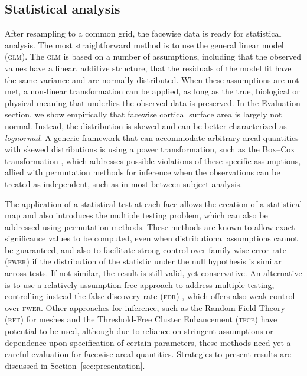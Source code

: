 \subsection{Statistical analysis}

After resampling to a common grid, the facewise data is ready for statistical analysis. The most straightforward method is to use the general linear model (\textsc{glm}). The \textsc{glm} is based on a number of assumptions, including that the observed values have a linear, additive structure, that the residuals of the model fit have the same variance and are normally distributed. When these assumptions are not met, a non-linear transformation can be applied, as long as the true, biological or physical meaning that underlies the observed data is preserved. In the Evaluation section, we show empirically that facewise cortical surface area is largely not normal. Instead, the distribution is skewed and can be better characterized as \emph{lognormal}. A generic framework that can accommodate arbitrary areal quantities with skewed distributions is using a power transformation, such as the Box--Cox transformation \citep{Box1964}, which addresses possible violations of these specific assumptions, allied with permutation methods for inference \citep{Holmes1996, Nichols2003} when the observations can be treated as independent, such as in most between-subject analysis.

The application of a statistical test at each face allows the creation of a statistical map and also introduces the multiple testing problem, which can also be addressed using permutation methods. These methods are known to allow exact significance values to be computed, even when distributional assumptions cannot be guaranteed, and also to facilitate strong control over family-wise error rate (\textsc{fwer}) if the distribution of the statistic under the null hypothesis is similar across tests. If not similar, the result is still valid, yet conservative. An alternative is to use a relatively assumption-free approach to address multiple testing, controlling instead the false discovery rate (\textsc{fdr}) \citep{Benjamini1995, Genovese2002}, which offers also weak control over \textsc{fwer}. Other approaches for inference, such as the Random Field Theory (\textsc{rft}) for meshes \citep{Worsley1999, Hagler2006} and the Threshold-Free Cluster Enhancement (\textsc{tfce}) \citep{Smith2009} have potential to be used, although due to reliance on stringent assumptions or dependence upon specification of certain parameters, these methods need yet a careful evaluation for facewise areal quantities. Strategies to present results are discussed in Section~\ref{sec:presentation}.

